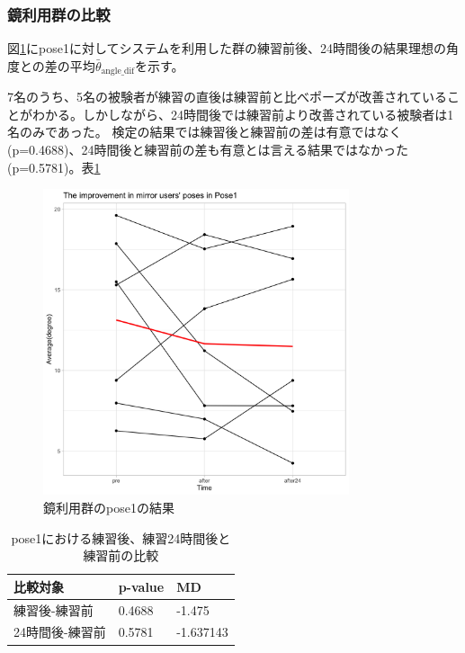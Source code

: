 \subsubsection{鏡利用群の比較}
図\ref{fig:pose1_mirror}にpose1に対してシステムを利用した群の練習前後、24時間後の結果理想の角度との差の平均\(\bar{\theta}_{\text{angle\_dif}}\)を示す。


7名のうち、5名の被験者が練習の直後は練習前と比べポーズが改善されていることがわかる。しかしながら、24時間後では練習前より改善されている被験者は1名のみであった。
検定の結果では練習後と練習前の差は有意ではなく(p=0.4688)、24時間後と練習前の差も有意とは言える結果ではなかった(p=0.5781)。表\ref{table:pose1_mirror_p_value}

\begin{figure}[H]
  \begin{center}
  \includegraphics[width=9cm]{figures/pose1_system_false_graph.png}
  \caption{鏡利用群のpose1の結果}
  \label{fig:pose1_mirror}
  \end{center}
\end{figure}

\begin{table}[h]
  \centering
  \caption{pose1における練習後、練習24時間後と練習前の比較}
  \begin{tabular}{|l|l|l|}
  \hline
  \textbf{比較対象} & \textbf{p-value} & \textbf{MD} \\ \hline
  練習後-練習前 & 0.4688 & -1.475 \\ \hline
  24時間後-練習前 & 0.5781 & -1.637143 \\ \hline
  \end{tabular}
  \label{table:pose1_mirror_p_value}
  \end{table}

